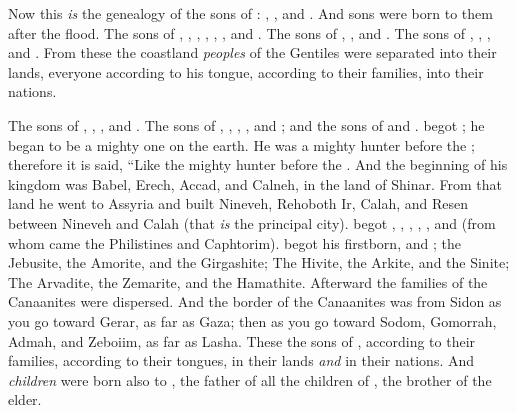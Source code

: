 
\bverse Now this \textit{is} the genealogy of the sons of : , , and . And sons were born to them after the flood.
\bverse The sons of  \were {}, , , , , , and .
\bverse The sons of  \were {}, , and .
\bverse The sons of  \were {}, , , and .
\bverse From these the coastland \textit{peoples} of the Gentiles were separated into their lands, everyone according to his tongue, according to their families, into their nations.

\bverse The sons of  \were {}, , , and .
\bverse The sons of  \were {}, , , , and ; and the sons of  \were {} and .
\bverse {} begot ; he began to be a mighty one on the earth.
\bverse He was a mighty hunter before the \lord; therefore it is said, ``Like  the mighty hunter before the \lord.
\bverse And the beginning of his kingdom was Babel, Erech, Accad, and Calneh, in the land of Shinar.
\bverse From that land he went to Assyria and built Nineveh, Rehoboth Ir, Calah,
\bverse and Resen between Nineveh and Calah (that \textit{is} the principal city).
\bverse {} begot , , , ,
\bverse {}, and  (from whom came the Philistines and Caphtorim).
\bverse {} begot  his firstborn, and ;
\bverse the Jebusite, the Amorite, and the Girgashite;
\bverse The Hivite, the Arkite, and the Sinite;
\bverse The Arvadite, the Zemarite, and the Hamathite. Afterward the families of the Canaanites were dispersed.
\bverse And the border of the Canaanites was from Sidon as you go toward Gerar, as far as Gaza; then as you go toward Sodom, Gomorrah, Admah, and Zeboiim, as far as Lasha.
\bverse These \were the sons of , according to their families, according to their tongues, in their lands \textit{and} in their nations.
\bverse And \textit{children} were born also to , the father of all the children of , the brother of  the elder.

